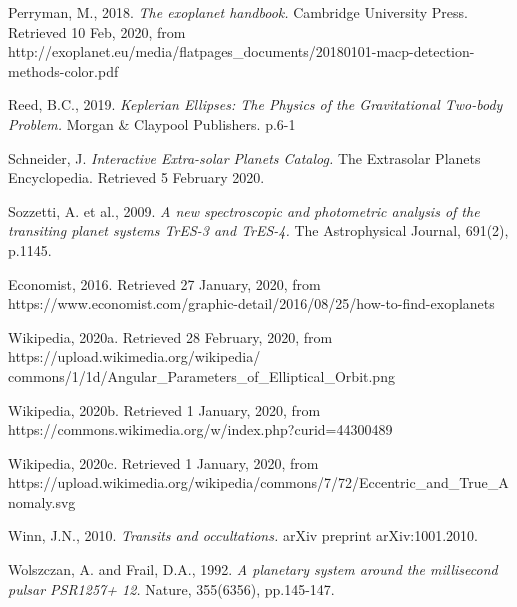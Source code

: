 \documentclass[11pt]{article}
\begin{document}
Perryman, M., 2018. \textit{The exoplanet handbook.} Cambridge University Press. Retrieved 10 Feb, 2020, from
http://exoplanet.eu/media/flatpages\_documents/20180101-macp-detection-methods-color.pdf

Reed, B.C., 2019. \textit{Keplerian Ellipses: The Physics of the Gravitational Two-body Problem.} Morgan \& Claypool Publishers. p.6-1

Schneider, J. \textit{Interactive Extra-solar Planets Catalog.} The
Extrasolar Planets Encyclopedia. Retrieved 5 February 2020.

Sozzetti, A. et al., 2009. \textit{A new spectroscopic and photometric analysis of the transiting planet systems TrES-3 and TrES-4.} The Astrophysical Journal, 691(2), p.1145.

Economist, 2016. Retrieved 27 January, 2020, from
https://www.economist.com/graphic-detail/2016/08/25/how-to-find-exoplanets

Wikipedia, 2020a. Retrieved 28 February, 2020, from https://upload.wikimedia.org/wikipedia/\\
commons/1/1d/Angular\_Parameters\_of\_Elliptical\_Orbit.png

Wikipedia, 2020b. Retrieved 1 January, 2020, from \\ https://commons.wikimedia.org/w/index.php?curid=44300489

Wikipedia, 2020c. Retrieved 1 January, 2020, from \\ https://upload.wikimedia.org/wikipedia/commons/7/72/Eccentric\_and\_True\_Anomaly.svg

Winn, J.N., 2010. \textit{Transits and occultations.} arXiv preprint
arXiv:1001.2010.

Wolszczan, A. and Frail, D.A., 1992. \textit{A planetary system around the millisecond pulsar PSR1257+ 12.} Nature, 355(6356), pp.145-147.

    
\end{document}
